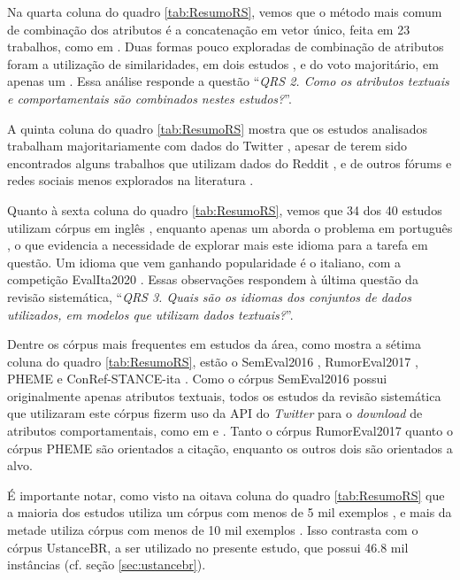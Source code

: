 \documentclass[
	12pt, oneside, a4paper, english, brazil
]{abntex2ppgsi}
\begin{document}
Na quarta coluna do quadro \ref{tab:ResumoRS}, vemos que o método mais comum de combinação dos atributos é a concatenação em vetor único, feita em 23 trabalhos, como em . Duas formas pouco exploradas de combinação de atributos foram a utilização de similaridades, em dois estudos \cite{tahar2017, mohand2018}, e do voto majoritário, em apenas um \cite{tanmoy2022}. Essa análise responde a questão ``{\em QRS 2. Como os atributos textuais e comportamentais são combinados nestes estudos?}''.

A quinta coluna do quadro \ref{tab:ResumoRS} mostra que os estudos analisados trabalham majoritariamente com dados do Twitter \cite{walid2022, kiat2022}, apesar de terem sido encontrados alguns trabalhos que utilizam dados do Reddit \cite{aono2020, lucie2022}, e de outros fórums e redes sociais menos explorados na literatura \cite{yuan2017, ku2018, stefan2022}.

Quanto à sexta coluna do quadro \ref{tab:ResumoRS}, vemos que 34 dos 40 estudos utilizam córpus em inglês \cite{walid2022, stefan2022}, enquanto apenas um aborda o problema em português \cite{becker2020}, o que evidencia a necessidade de explorar mais este idioma para a tarefa em questão. Um idioma que vem ganhando popularidade é o italiano, com a competição EvalIta2020 \cite{cignarella2020}. Essas observações respondem à última questão da revisão sistemática, ``{\em QRS 3. Quais são os idiomas dos conjuntos de dados utilizados, em modelos que utilizam dados textuais?}''.

Dentre os córpus mais frequentes em estudos da área, como mostra a sétima coluna do quadro \ref{tab:ResumoRS}, estão o SemEval2016 \cite{semeval2016}, RumorEval2017 \cite{rumoreval2017}, PHEME \cite{pheme} e ConRef-STANCE-ita \cite{paolo2019}. Como o córpus SemEval2016 possui originalmente apenas atributos textuais, todos os estudos da revisão sistemática que utilizaram este córpus fizerm uso da API do {\em Twitter} para o {\em download} de atributos comportamentais, como em  e . Tanto o córpus RumorEval2017 quanto o córpus PHEME são orientados a citação, enquanto os outros dois são orientados a alvo.

É importante notar, como visto na oitava coluna do quadro \ref{tab:ResumoRS} que a maioria dos estudos utiliza um córpus com menos de 5 mil exemplos \cite{walid2022, kiat2022}, e mais da metade utiliza córpus com menos de 10 mil exemplos \cite{abdelzaher2020, aono2020}. Isso contrasta com o córpus UstanceBR, a ser utilizado no presente estudo, que possui 46.8 mil instâncias (cf. seção \ref{sec:ustancebr}).
\end{document}
